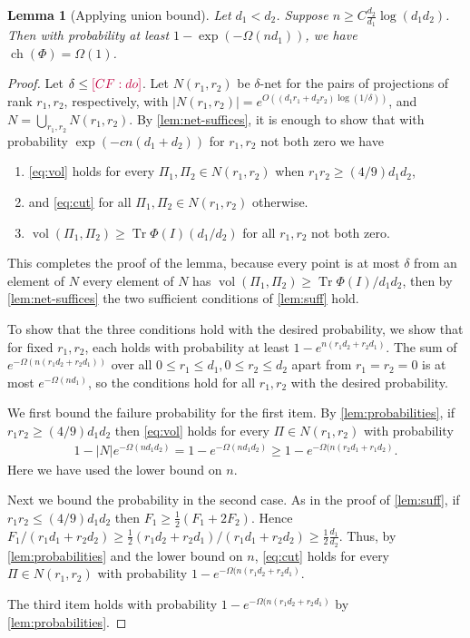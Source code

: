 \documentclass{article}
\newtheorem{lemma}[theorem]{Lemma}
\newcommand{\ch}{\operatorname{ch}}
\newcommand{\vol}{\operatorname{vol}}
\newcommand\tr{\operatorname{Tr}}
\newcommand{\CF}[1]{{\color{purple}[CF: #1]}}
\begin{document}
\begin{lemma}[Applying union bound]\label{lem:union}
Let $d_1 < d_2$. Suppose $n \geq C \frac{d_2}{d_1} \log (d_1 d_2)$. Then with probability at least $1 - \exp( - \Omega(n d_1))$, we have $\ch(\Phi) = \Omega(1)$.
\end{lemma}
\begin{proof} Let $\delta \leq \CF{do}$. Let $N(r_1, r_2)$ be $\delta$-net for the pairs of projections of rank $r_1, r_2$, respectively, with $|N(r_1, r_2)| = e^{O((d_1r_1 + d_2 r_2) \log(1/\delta))}$, and $N = \bigcup_{r_1, r_2} N(r_1, r_2)$. By \cref{lem:net-suffices}, it is enough to show that with probability $\exp( - c n (d_1 + d_2))$ for $r_1, r_2$ not both zero we have
\begin{enumerate}
\item \cref{eq:vol} holds for every $\Pi_1,\Pi_2 \in N(r_1, r_2)$ when $r_1 r_2 \geq (4/9) d_1 d_2$,
\item  and \cref{eq:cut} for all $\Pi_1, \Pi_2 \in N(r_1, r_2)$ otherwise.
\item $\vol(\Pi_1, \Pi_2) \geq \tr \Phi(I) (d_1/d_2)$ for all $r_1, r_2$ not both zero.
\end{enumerate}
This completes the proof of the lemma, because every point is at most $\delta$ from an element of $N$ every element of $N$ has $\vol(\Pi_1, \Pi_2) \geq \tr \Phi(I)/{d_1 d_2}$, then by \cref{lem:net-suffices} the two sufficient conditions of \cref{lem:suff} hold. 

To show that the three conditions hold with the desired probability, we show that for fixed $r_1, r_2$, each holds with probability at least $1 - e^{n (r_1 d_2 + r_2 d_1)}$. The sum of $e^{-\Omega(n (r_1d_2 + r_2 d_1))}$ over all $0 \leq r_1 \leq d_1, 0 \leq r_2 \leq d_2$ apart from $r_1 = r_2 = 0$ is at most $e^{- \Omega( n d_1)}$, so the conditions hold for all $r_1, r_2$ with the desired probability. 

We first bound the failure probability for the first item. By \cref{lem:probabilities}, if $r_1 r_2 \geq (4/9) d_1 d_2$ then \cref{eq:vol} holds for every $\Pi \in N(r_1, r_2)$ with probability 
\begin{align*}
1 - |N|e^{- \Omega( n d_1 d_2) } = 1 - e^{-\Omega(n d_1 d_2)} \geq 1 - e^{ - \Omega(n (r_2d_1 + r_1d_2)}.
\end{align*}
Here we have used the lower bound on $n$. 

Next we bound the probability in the second case. As in the proof of \cref{lem:suff}, if $r_1 r_2 \leq (4/9) d_1 d_2$ then $F_1 \geq \frac{1}{2} (F_1 + 2 F_2)$. Hence $F_1/ (r_1 d_1 + r_2 d_2) \geq \frac{1}{2} (r_1 d_2 + r_2 d_1)/(r_1 d_1 + r_2 d_2) \geq \frac{1}{2} \frac{d_1}{d_2}$. Thus, by \cref{lem:probabilities} and the lower bound on $n$, \cref{eq:cut} holds for every $\Pi \in N(r_1, r_2)$ with probability $1 - e^{-\Omega(n (r_1d_2 + r_2 d_1)}.$ 

The third item holds with probability $1 - e^{-\Omega(n (r_1d_2 + r_2 d_1)}$ by \cref{lem:probabilities}. \end{proof}
\end{document}
